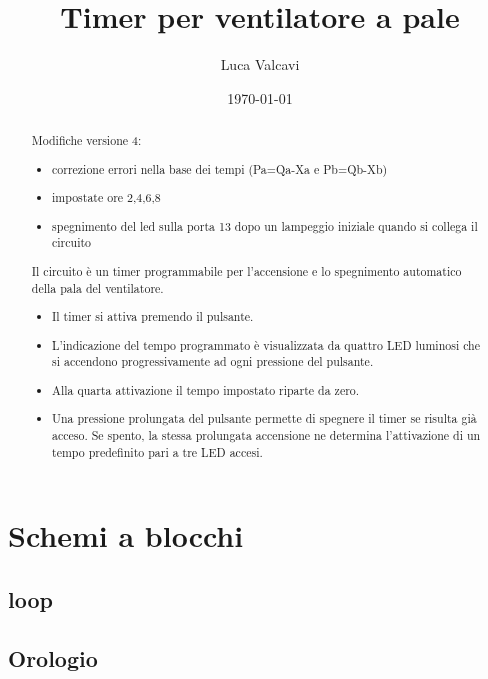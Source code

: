\documentclass[DIV=24]{scrartcl}
\title{Timer per ventilatore a pale}
\author{Luca Valcavi}
\date{\today}
\begin{document}
    \setmainfont{DejaVu Sans Mono}
    \maketitle
    \tableofcontents
    \begin{abstract}
    	Modifiche versione 4:
    	\begin{itemize}
    		\item correzione errori nella base dei tempi (Pa=Qa-Xa e Pb=Qb-Xb)
    		\item impostate ore 2,4,6,8
    		\item spegnimento del led sulla porta 13 dopo un lampeggio iniziale quando si collega il circuito
    	\end{itemize}
    	\bigskip
        Il circuito è un timer programmabile per l'accensione e lo spegnimento automatico della pala del ventilatore. 
        \begin{itemize}
        \item Il timer si attiva premendo il pulsante. 
        \item L'indicazione del tempo programmato è visualizzata da quattro LED luminosi che si accendono progressivamente ad ogni pressione del pulsante.
        \item Alla quarta attivazione il tempo impostato riparte da zero.        
        \item Una pressione prolungata del pulsante permette di spegnere il timer se risulta già acceso. Se  spento, la stessa prolungata accensione ne determina l'attivazione di un tempo predefinito pari a tre LED accesi.
        \end{itemize}
    \end{abstract}
    \section{Schemi a blocchi}    
    \subsection{loop}
    \begin{center}
        
    \end{center}
    \subsection{Orologio}
    \begin{center}
        
    \end{center}    
\end{document}
